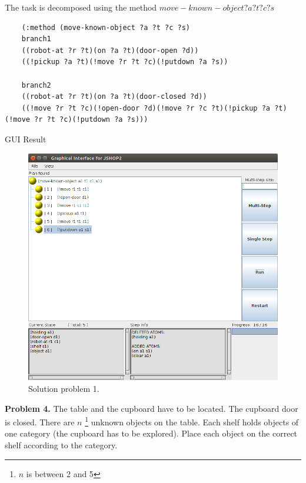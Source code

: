 \documentclass{beamer}
\begin{document}
		
		\textbf{                                                     }
		\textbf{                                                     }
		\textbf{                                                     }
		\textbf{                                                     }
		\textbf{                                                     }
		\textbf{                                                     }

		
	The task is decomposed using the method $move-known-object ?a ?t ?c ?s$
	
	\begin{lstlisting}
	(:method (move-known-object ?a ?t ?c ?s)
	branch1
	((robot-at ?r ?t)(on ?a ?t)(door-open ?d))
	((!pickup ?a ?t)(!move ?r ?t ?c)(!putdown ?a ?s))
	
	branch2
	((robot-at ?r ?t)(on ?a ?t)(door-closed ?d))
	((!move ?r ?t ?c)(!open-door ?d)(!move ?r ?c ?t)(!pickup ?a ?t)(!move ?r ?t ?c)(!putdown ?a ?s)))
	\end{lstlisting}

	
	\begin{frame}{GUI Result}
		\begin{figure}[h!]
			\centering
			\includegraphics[width=0.7\linewidth]{images/problem1_gui}
			\caption{Solution problem 1.}
			\label{fig:probem1_gui}
		\end{figure}
	\end{frame}
	
	
	\begin{frame}
		\textbf{Problem 4.} The table and the cupboard have to be located. The cupboard door is closed. There are $n$ \footnote{$n$ is between 2 and 5} unknown objects on the table. Each shelf holds objects of one category (the cupboard has to be explored). Place each object on the correct shelf according to the category.
			
	\end{frame}
	
\end{document}
